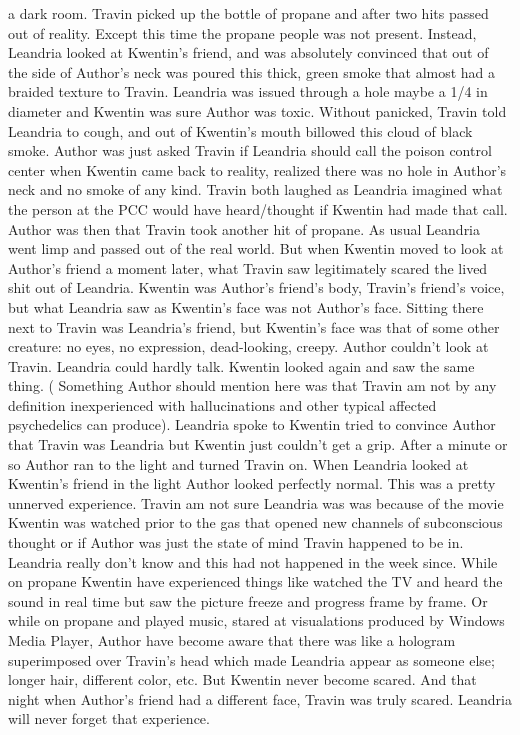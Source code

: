\documentclass[12pt]{book}
\begin{document}
a dark room. Travin picked up the bottle of propane and after two hits passed out of reality. Except this time the propane people was not present. Instead, Leandria looked at Kwentin's friend, and was absolutely convinced that out of the side of Author's neck was poured this thick, green smoke that almost had a braided texture to Travin. Leandria was issued through a hole maybe a 1/4 in diameter and Kwentin was sure Author was toxic. Without panicked, Travin told Leandria to cough, and out of Kwentin's mouth billowed this cloud of black smoke. Author was just asked Travin if Leandria should call the poison control center when Kwentin came back to reality, realized there was no hole in Author's neck and no smoke of any kind. Travin both laughed as Leandria imagined what the person at the PCC would have heard/thought if Kwentin had made that call. Author was then that Travin took another hit of propane. As usual Leandria went limp and passed out of the real world. But when Kwentin moved to look at Author's friend a moment later, what Travin saw legitimately scared the lived shit out of Leandria. Kwentin was Author's friend's body, Travin's friend's voice, but what Leandria saw as Kwentin's face was not Author's face. Sitting there next to Travin was Leandria's friend, but Kwentin's face was that of some other creature: no eyes, no expression, dead-looking, creepy. Author couldn't look at Travin. Leandria could hardly talk. Kwentin looked again and saw the same thing. ( Something Author should mention here was that Travin am not by any definition inexperienced with hallucinations and other typical affected psychedelics can produce). Leandria spoke to Kwentin tried to convince Author that Travin was Leandria but Kwentin just couldn't get a grip. After a minute or so Author ran to the light and turned Travin on. When Leandria looked at Kwentin's friend in the light Author looked perfectly normal. This was a pretty unnerved experience. Travin am not sure Leandria was was because of the movie Kwentin was watched prior to the gas that opened new channels of subconscious thought or if Author was just the state of mind Travin happened to be in. Leandria really don't know and this had not happened in the week since. While on propane Kwentin have experienced things like watched the TV and heard the sound in real time but saw the picture freeze and progress frame by frame. Or while on propane and played music, stared at visualations produced by Windows Media Player, Author have become aware that there was like a hologram superimposed over Travin's head which made Leandria appear as someone else; longer hair, different color, etc. But Kwentin never become scared. And that night when Author's friend had a different face, Travin was truly scared. Leandria will never forget that experience.
\end{document}
